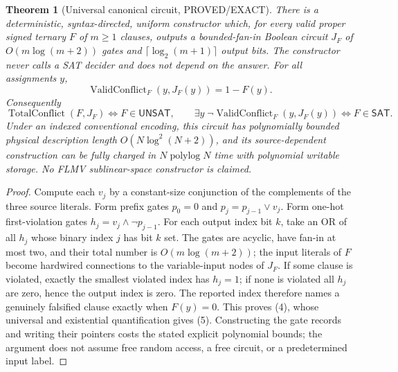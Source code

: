 \documentclass[11pt]{article}
\newtheorem{theorem}{Theorem}
\newcommand{\SAT}{\mathsf{SAT}}
\newcommand{\UNSAT}{\mathsf{UNSAT}}
\begin{document}
\begin{theorem}[Universal canonical circuit, PROVED/EXACT]\label{th:canonical}
There is a deterministic, syntax-directed, uniform constructor which, for every valid proper signed ternary $F$ of $m\ge1$ clauses, outputs a bounded-fan-in Boolean circuit $J_F$ of $O(m\log(m+2))$ gates and $\lceil\log_2(m+1)\rceil$ output bits. The constructor never calls a SAT decider and does not depend on the answer. For all assignments $y$,
\[
\operatorname{ValidConflict}_F(y,J_F(y))=1-F(y).\tag{4}
\]
Consequently
\[
\boxed{\operatorname{TotalConflict}(F,J_F)\iff F\in\UNSAT},\qquad
\boxed{\exists y\;\neg\operatorname{ValidConflict}_F(y,J_F(y))\iff F\in\SAT}.\tag{5}
\]
Under an indexed conventional encoding, this circuit has polynomially bounded physical description length $O(N\log^2(N+2))$, and its source-dependent construction can be fully charged in $N\operatorname{polylog}N$ time with polynomial writable storage. No FLMV sublinear-space constructor is claimed.
\end{theorem}
\begin{proof}
Compute each $v_j$ by a constant-size conjunction of the complements of the three source literals. Form prefix gates $p_0=0$ and $p_j=p_{j-1}\vee v_j$. Form one-hot first-violation gates $h_j=v_j\wedge\neg p_{j-1}$. For each output index bit $k$, take an OR of all $h_j$ whose binary index $j$ has bit $k$ set. The gates are acyclic, have fan-in at most two, and their total number is $O(m\log(m+2))$; the input literals of $F$ become hardwired connections to the variable-input nodes of $J_F$. If some clause is violated, exactly the smallest violated index has $h_j=1$; if none is violated all $h_j$ are zero, hence the output index is zero. The reported index therefore names a genuinely falsified clause exactly when $F(y)=0$. This proves (4), whose universal and existential quantification gives (5). Constructing the gate records and writing their pointers costs the stated explicit polynomial bounds; the argument does not assume free random access, a free circuit, or a predetermined input label.\end{proof}
\end{document}
